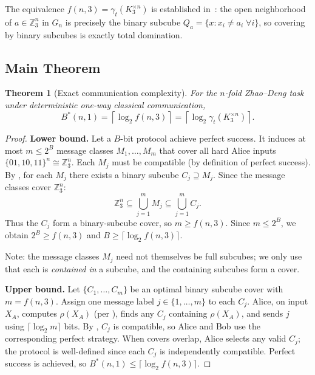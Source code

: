 \documentclass[11pt,letterpaper]{article}
\newtheorem{theorem}{Theorem}
\newcommand{\Z}{\mathbb{Z}}
\newcommand{\gammat}{\gamma_t}
\newcommand{\Bstar}{B^{\!*}}
\begin{document}
The equivalence $f(n,3) = \gammat(K_3^{\times n})$ is established in~\cite{adriaensen2026,kuangwang2026}: the open neighborhood of $a \in \Z_3^n$ in $G_n$ is precisely the binary subcube $Q_a = \{x : x_i \neq a_i\;\forall i\}$, so covering by binary subcubes is exactly total domination.

\subsection{Main Theorem}

\begin{theorem}[Exact communication complexity]
\label{thm:main}
For the $n$-fold Zhao--Deng task under deterministic one-way classical communication,
\[
  \Bstar(n,1) = \left\lceil \log_2 f(n,3) \right\rceil = \left\lceil \log_2 \gammat(K_3^{\times n}) \right\rceil.
\]
\end{theorem}

\begin{proof}
\textbf{Lower bound.} Let a $B$-bit protocol achieve perfect success. It induces at most $m \leq 2^B$ message classes $M_1, \ldots, M_m$ that cover all hard Alice inputs $\{01,10,11\}^n \cong \Z_3^n$. Each $M_j$ must be compatible (by definition of perfect success). By , for each $M_j$ there exists a binary subcube $C_j \supseteq M_j$. Since the message classes cover $\Z_3^n$:
\[
  \Z_3^n \subseteq \bigcup_{j=1}^m M_j \subseteq \bigcup_{j=1}^m C_j.
\]
Thus the $C_j$ form a binary-subcube cover, so $m \geq f(n,3)$. Since $m \leq 2^B$, we obtain $2^B \geq f(n,3)$ and $B \geq \lceil \log_2 f(n,3) \rceil$.

Note: the message classes $M_j$ need not themselves be full subcubes; we only use that each is \emph{contained in} a subcube, and the containing subcubes form a cover.

\textbf{Upper bound.} Let $\{C_1, \ldots, C_m\}$ be an optimal binary subcube cover with $m = f(n,3)$. Assign one message label $j \in \{1,\ldots,m\}$ to each $C_j$. Alice, on input $X_A$, computes $\rho(X_A)$ (per ), finds any $C_j$ containing $\rho(X_A)$, and sends $j$ using $\lceil \log_2 m \rceil$ bits. By , $C_j$ is compatible, so Alice and Bob use the corresponding perfect strategy. When covers overlap, Alice selects any valid $C_j$; the protocol is well-defined since each $C_j$ is independently compatible. Perfect success is achieved, so $\Bstar(n,1) \leq \lceil \log_2 f(n,3) \rceil$.
\end{proof}
\end{document}

